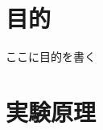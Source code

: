 \documentclass[main]{subfiles}
\begin{document}
\section{目的}
ここに目的を書く 

\section{実験原理}
\end{document}
